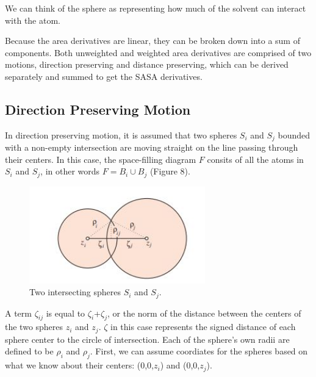 \documentclass{article}
\newcommand{\R}{\mathbb{R}}
\begin{document}
We can think of the sphere as representing how much of the solvent can interact with the atom. 

Because the area derivatives are linear, they can be broken down into a sum of components. Both unweighted and weighted area derivatives are comprised of two motions, direction preserving and distance preserving, which can be derived separately and summed to get the SASA derivatives.
 
\subsection{Direction Preserving Motion} 
In direction preserving motion, it is assumed that two spheres $S_i$ and $S_j$ bounded with a non-empty intersection are moving straight on the line passing through their centers.
In this case, the space-filling diagram $F$ consits of all the atoms in $S_i$ and $S_j$, in other words $F = B_i \cup B_j$ (Figure 8).

\begin{figure}[h!]
\caption{Two intersecting spheres $S_i$ and $S_j$.\cite{Bryant}}
\centerline{\includegraphics[width=3in]{Figure6}}
\end{figure}


A term $\zeta_{ij}$ is equal to  $\zeta_i$+$\zeta_j$, or the norm of the distance between the centers of the two spheres $z_i$ and $z_j$. $\zeta$ in this case represents the signed distance of each sphere center to the circle of intersection. Each of the sphere's own radii are defined to be $\rho_i$ and $\rho_j$. First, we can assume coordiates for the spheres based on what we know about their centers:
(0,0,$z_i$) and (0,0,$z_j$).
\end{document}
